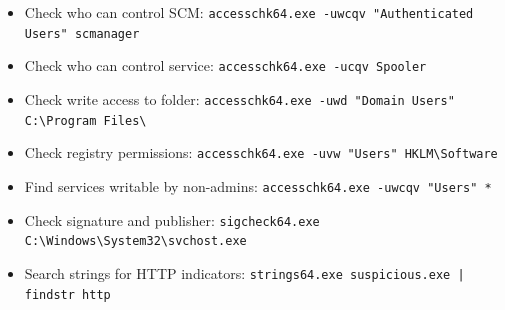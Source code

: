 \documentclass[10pt]{article}
\begin{document}
\begin{tcolorbox}[title=Sysinternals Quick Checks]
\begin{itemize}[leftmargin=1.1em, itemsep=1pt, topsep=2pt]
  \item Check who can control SCM: \verb!accesschk64.exe -uwcqv "Authenticated Users" scmanager!
  \item Check who can control service: \verb!accesschk64.exe -ucqv Spooler!
  \item Check write access to folder: \verb!accesschk64.exe -uwd "Domain Users" C:\Program Files\!
  \item Check registry permissions: \verb!accesschk64.exe -uvw "Users" HKLM\Software!
  \item Find services writable by non-admins: \verb!accesschk64.exe -uwcqv "Users" *!
  \item Check signature and publisher: \verb!sigcheck64.exe C:\Windows\System32\svchost.exe!
  \item Search strings for HTTP indicators: \verb!strings64.exe suspicious.exe | findstr http!
\end{itemize}
\end{tcolorbox}
\end{document}
